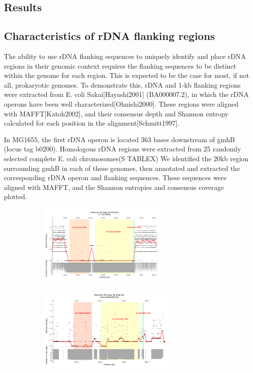 \documentclass[11pt]{article}
\begin{document}
\begin{linenumbers}
\section*{Results}
\subsection{Characteristics of rDNA flanking regions}
The ability to use rDNA flanking sequences to uniquely identify and place rDNA regions in their genomic context requires the flanking sequences to be distinct within the genome for each region. This is expected to be the case for most, if not all, prokaryotic genomes. To demonstrate this, rDNA and 1-kb flanking regions were extracted from E. coli Sakai[Hayashi2001] (BA000007.2), in which the rDNA operons have been well characterized[Ohnishi2000]. These regions were aligned with MAFFT[Katoh2002], and their consensus depth and Shannon entropy calculated for each position in the alignment[Schmitt1997].


In MG1655, the first rDNA operon is located 363 bases downstream of gmhB (locus tag b0200). Homologous rDNA regions were extracted from 25 randomly selected complete E. coli chromosomes(S TABLEX)  We identified the 20kb region surrounding gmhB in each of these genomes, then annotated and extracted the corresponding rDNA operon and flanking sequences. These sequences were aligned with MAFFT, and the Shannon entropies and consensus coverage plotted.


\begin{figure}[h]
    \centering
    \begin{subfigure}[b]{.9\textwidth}
      \includegraphics[width=0.7\textwidth]{entropy_plot}
      \caption{}
      \label{fig:Ng1}
    \end{subfigure}
    \begin{subfigure}[b]{.9\textwidth}
      \includegraphics[width=0.75\textwidth]{entropy_plot_gmbH}
      \caption{}
      \label{fig:Ng2}
    \end{subfigure}


\end{figure}
\end{linenumbers}
\end{document}
